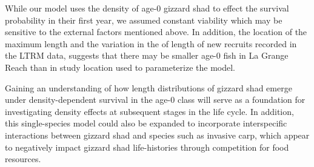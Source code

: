 \documentclass[preprint,review,12pt,authoryear]{elsarticle}
\begin{document}
While our model uses the density of age-0 gizzard shad to effect the survival probability in their first year, we assumed constant viability which may be sensitive to the external factors mentioned above.
In addition, the location of the maximum length and the variation in the of length of new recruits recorded in the LTRM data, suggests that there may be smaller age-0 fish in La Grange Reach than in study location \citep{michaletz2017variation} used to parameterize the model.  

Gaining an understanding of how length distributions of gizzard shad emerge under density-dependent survival in the age-0 class will serve as a foundation for investigating density effects at subsequent stages in the life cycle.  
In addition, this single-species model could also be expanded to incorporate interspecific interactions between gizzard shad and species such as invasive carp, which appear to negatively impact gizzard shad life-histories through competition for food resources.   

\end{document}
